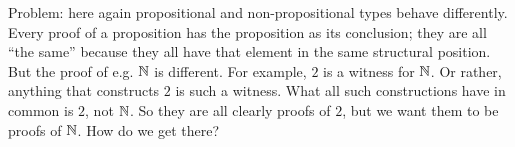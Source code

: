 \documentclass[12pt,toc]{tufte-handout}
\theoremstyle{plain}
\begin{document}
\begin{remark}
  Problem: here again propositional and non-propositional types behave
  differently.  Every proof of a proposition has the proposition as
  its conclusion; they are all ``the same'' because they all have that
  element in the same structural position.  But the proof of
  e.g. \(\mathbb{N}\) is different.  For example, \(2\) is a witness for
  \(\mathbb{N}\).  Or rather, anything that constructs \(2\) is such a
  witness.  What all such constructions have in common is \(2\), not
  \(\mathbb{N}\).  So they are all clearly proofs of \(2\), but we want them
  to be proofs of \(\mathbb{N}\).  How do we get there?
\end{remark}




\end{document}
